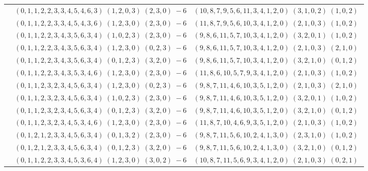 \documentclass[11pt]{article}
\begin{document}
\begin{longtable}[l]{|c|c|c|}
 \cline{2-3} 
 & $(0 ,1 ,1 ,2 ,2 ,3 ,3 ,4 ,5 ,4 ,6 ,3) \;(1 ,2 ,0 ,3) \;(2 ,3 ,0) \;-6$ & $(10 ,8 ,7 ,9 ,5 ,6 ,11 ,3 ,4 ,1 ,2 ,0) \;(3 ,1 ,0 ,2) \;(1 ,0 ,2) \;$\\ 
 \cline{2-3} 
 & $(0 ,1 ,1 ,2 ,2 ,3 ,3 ,4 ,5 ,4 ,3 ,6) \;(1 ,2 ,3 ,0) \;(2 ,3 ,0) \;-6$ & $(11 ,8 ,7 ,9 ,5 ,6 ,10 ,3 ,4 ,1 ,2 ,0) \;(2 ,1 ,0 ,3) \;(1 ,0 ,2) \;$\\ 
 \cline{2-3} 
 & $(0 ,1 ,1 ,2 ,2 ,3 ,4 ,3 ,5 ,6 ,3 ,4) \;(1 ,0 ,2 ,3) \;(2 ,3 ,0) \;-6$ & $(9 ,8 ,6 ,11 ,5 ,7 ,10 ,3 ,4 ,1 ,2 ,0) \;(3 ,2 ,0 ,1) \;(1 ,0 ,2) \;$\\ 
 \cline{2-3} 
 & $(0 ,1 ,1 ,2 ,2 ,3 ,4 ,3 ,5 ,6 ,3 ,4) \;(1 ,2 ,3 ,0) \;(0 ,2 ,3) \;-6$ & $(9 ,8 ,6 ,11 ,5 ,7 ,10 ,3 ,4 ,1 ,2 ,0) \;(2 ,1 ,0 ,3) \;(2 ,1 ,0) \;$\\ 
 \cline{2-3} 
 & $(0 ,1 ,1 ,2 ,2 ,3 ,4 ,3 ,5 ,6 ,3 ,4) \;(0 ,1 ,2 ,3) \;(3 ,2 ,0) \;-6$ & $(9 ,8 ,6 ,11 ,5 ,7 ,10 ,3 ,4 ,1 ,2 ,0) \;(3 ,2 ,1 ,0) \;(0 ,1 ,2) \;$\\ 
 \cline{2-3} 
 & $(0 ,1 ,1 ,2 ,2 ,3 ,4 ,3 ,5 ,3 ,4 ,6) \;(1 ,2 ,3 ,0) \;(2 ,3 ,0) \;-6$ & $(11 ,8 ,6 ,10 ,5 ,7 ,9 ,3 ,4 ,1 ,2 ,0) \;(2 ,1 ,0 ,3) \;(1 ,0 ,2) \;$\\ 
 \cline{2-3} 
 & $(0 ,1 ,1 ,2 ,3 ,2 ,3 ,4 ,5 ,6 ,3 ,4) \;(1 ,2 ,3 ,0) \;(0 ,2 ,3) \;-6$ & $(9 ,8 ,7 ,11 ,4 ,6 ,10 ,3 ,5 ,1 ,2 ,0) \;(2 ,1 ,0 ,3) \;(2 ,1 ,0) \;$\\ 
 \cline{2-3} 
 & $(0 ,1 ,1 ,2 ,3 ,2 ,3 ,4 ,5 ,6 ,3 ,4) \;(1 ,0 ,2 ,3) \;(2 ,3 ,0) \;-6$ & $(9 ,8 ,7 ,11 ,4 ,6 ,10 ,3 ,5 ,1 ,2 ,0) \;(3 ,2 ,0 ,1) \;(1 ,0 ,2) \;$\\ 
 \cline{2-3} 
 & $(0 ,1 ,1 ,2 ,3 ,2 ,3 ,4 ,5 ,6 ,3 ,4) \;(0 ,1 ,2 ,3) \;(3 ,2 ,0) \;-6$ & $(9 ,8 ,7 ,11 ,4 ,6 ,10 ,3 ,5 ,1 ,2 ,0) \;(3 ,2 ,1 ,0) \;(0 ,1 ,2) \;$\\ 
 \cline{2-3} 
 & $(0 ,1 ,1 ,2 ,3 ,2 ,3 ,4 ,5 ,3 ,4 ,6) \;(1 ,2 ,3 ,0) \;(2 ,3 ,0) \;-6$ & $(11 ,8 ,7 ,10 ,4 ,6 ,9 ,3 ,5 ,1 ,2 ,0) \;(2 ,1 ,0 ,3) \;(1 ,0 ,2) \;$\\ 
 \cline{2-3} 
 & $(0 ,1 ,2 ,1 ,2 ,3 ,3 ,4 ,5 ,6 ,3 ,4) \;(0 ,1 ,3 ,2) \;(2 ,3 ,0) \;-6$ & $(9 ,8 ,7 ,11 ,5 ,6 ,10 ,2 ,4 ,1 ,3 ,0) \;(2 ,3 ,1 ,0) \;(1 ,0 ,2) \;$\\ 
 \cline{2-3} 
 & $(0 ,1 ,2 ,1 ,2 ,3 ,3 ,4 ,5 ,6 ,3 ,4) \;(0 ,1 ,2 ,3) \;(3 ,2 ,0) \;-6$ & $(9 ,8 ,7 ,11 ,5 ,6 ,10 ,2 ,4 ,1 ,3 ,0) \;(3 ,2 ,1 ,0) \;(0 ,1 ,2) \;$\\ 
 \cline{2-3} 
 & $(0 ,1 ,1 ,2 ,2 ,3 ,3 ,4 ,5 ,3 ,6 ,4) \;(1 ,2 ,3 ,0) \;(3 ,0 ,2) \;-6$ & $(10 ,8 ,7 ,11 ,5 ,6 ,9 ,3 ,4 ,1 ,2 ,0) \;(2 ,1 ,0 ,3) \;(0 ,2 ,1) \;$\\ 

\end{longtable}
\end{document}
